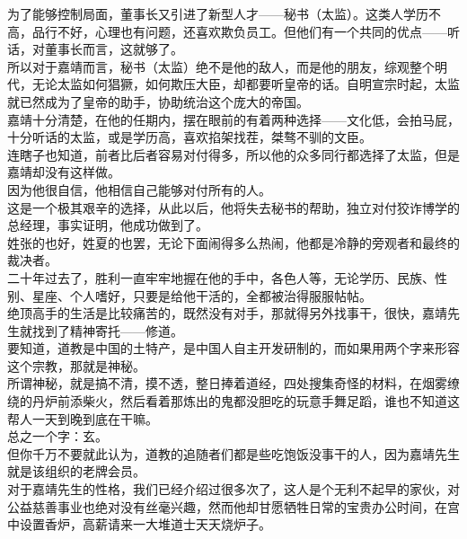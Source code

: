 \begin{multicols}{\theparacolNo}
为了能够控制局面，董事长又引进了新型人才——秘书（太监）。这类人学历不高，品行不好，心理也有问题，还喜欢欺负员工。但他们有一个共同的优点——听话，对董事长而言，这就够了。\\

所以对于嘉靖而言，秘书（太监）绝不是他的敌人，而是他的朋友，综观整个明代，无论太监如何猖獗，如何欺压大臣，却都要听皇帝的话。自明宣宗时起，太监就已然成为了皇帝的助手，协助统治这个庞大的帝国。\\

嘉靖十分清楚，在他的任期内，摆在眼前的有着两种选择——文化低，会拍马屁，十分听话的太监，或是学历高，喜欢掐架找茬，桀骜不驯的文臣。\\

连瞎子也知道，前者比后者容易对付得多，所以他的众多同行都选择了太监，但是嘉靖却没有这样做。\\

因为他很自信，他相信自己能够对付所有的人。\\

这是一个极其艰辛的选择，从此以后，他将失去秘书的帮助，独立对付狡诈博学的总经理，事实证明，他成功做到了。\\

姓张的也好，姓夏的也罢，无论下面闹得多么热闹，他都是冷静的旁观者和最终的裁决者。\\

二十年过去了，胜利一直牢牢地握在他的手中，各色人等，无论学历、民族、性别、星座、个人嗜好，只要是给他干活的，全都被治得服服帖帖。\\

绝顶高手的生活是比较痛苦的，既然没有对手，那就得另外找事干，很快，嘉靖先生就找到了精神寄托——修道。\\

要知道，道教是中国的土特产，是中国人自主开发研制的，而如果用两个字来形容这个宗教，那就是神秘。\\

所谓神秘，就是搞不清，摸不透，整日捧着道经，四处搜集奇怪的材料，在烟雾缭绕的丹炉前添柴火，然后看着那炼出的鬼都没胆吃的玩意手舞足蹈，谁也不知道这帮人一天到晚到底在干嘛。\\

总之一个字：玄。\\

但你千万不要就此认为，道教的追随者们都是些吃饱饭没事干的人，因为嘉靖先生就是该组织的老牌会员。\\

对于嘉靖先生的性格，我们已经介绍过很多次了，这人是个无利不起早的家伙，对公益慈善事业也绝对没有丝毫兴趣，然而他却甘愿牺牲日常的宝贵办公时间，在宫中设置香炉，高薪请来一大堆道士天天烧炉子。\\


\end{multicols}
